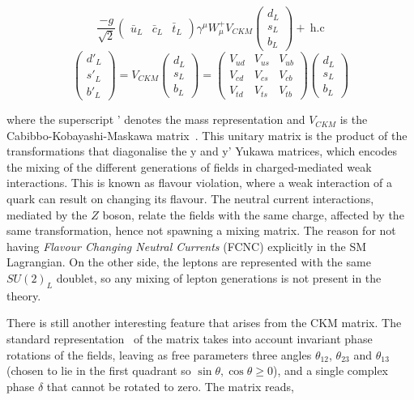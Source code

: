 \begin{equation}
    \frac{-g}{\sqrt{2}} \begin{pmatrix} \bar{u}_L & \bar{c}_L & \bar{t}_L \end{pmatrix} \gamma^\mu W_\mu^+ V_{CKM} \begin{pmatrix} d_L \\ s_L \\ b_L \end{pmatrix} +\ \text{h.c}
\end{equation}
\begin{equation}
\begin{pmatrix} d'_L \\ s'_L \\ b'_L \end{pmatrix} = V_{CKM}\begin{pmatrix} d_L \\ s_L \\ b_L \end{pmatrix} =\begin{pmatrix} V_{ud} & V_{us} & V_{ub} \\ V_{cd} & V_{cs} & V_{cb} \\ V_{td} & V_{ts} & V_{tb} \end{pmatrix} \begin{pmatrix} d_L \\ s_L \\ b_L \end{pmatrix}
\end{equation}

where the superscript ' denotes the mass representation and $V_{CKM}$ is the Cabibbo-Kobayashi-Maskawa matrix~\cite{Cabibbo,KobayaMaska}. This unitary matrix is the product of the transformations that diagonalise the y and y' Yukawa matrices, which encodes the mixing of the different generations of fields in charged-mediated weak interactions. This is known as flavour violation, where a weak interaction of a quark can result on changing its flavour. The neutral current interactions, mediated by the $Z$ boson, relate the fields with the same charge, affected by the same transformation, hence not spawning a mixing matrix. The reason for not having \textit{Flavour Changing Neutral Currents} (FCNC) explicitly in the SM Lagrangian. On the other side, the leptons are represented with the same $SU(2)_L$ doublet, so any mixing of lepton generations is not present in the theory.

There is still another interesting feature that arises from the CKM matrix. The standard representation~\cite{Ling-Lie} of the matrix takes into account invariant phase rotations of the fields, leaving as free parameters three angles $\theta_{12}$, $\theta_{23}$ and $\theta_{13}$ (chosen to lie in the first quadrant so $\sin\theta,\cos\theta\geq0$), and a single complex phase $\delta$ that cannot be rotated to zero. The matrix reads,

